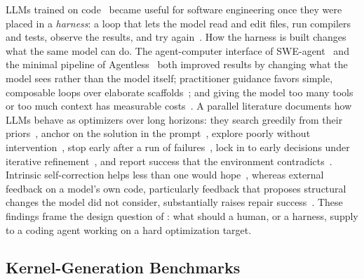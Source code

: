 LLMs trained on code~\cite{chen2021evaluating} became useful for software engineering once they were placed in a \emph{harness}: a loop that lets the model read and edit files, run compilers and tests, observe the results, and try again~\cite{yang2024sweagent,openhands,anthropic2025claudecode,codex}.
How the harness is built changes what the same model can do.
The agent-computer interface of SWE-agent~\cite{yang2024sweagent} and the minimal pipeline of Agentless~\cite{xia2024agentless} both improved results by changing what the model sees rather than the model itself; practitioner guidance favors simple, composable loops over elaborate scaffolds~\cite{anthropic2024effectiveagents}; and giving the model too many tools or too much context has measurable costs~\cite{langchain2025toolload,liu2024lost}.
A parallel literature documents how LLMs behave as optimizers over long horizons: they search greedily from their priors~\cite{redko2026priorknowledge}, anchor on the solution in the prompt~\cite{jones2022cognitivebiases}, explore poorly without intervention~\cite{krishnamurthy2024explore}, stop early after a run of failures~\cite{merouani2025compilot}, lock in to early decisions under iterative refinement~\cite{javaji2025turnwise}, and report success that the environment contradicts~\cite{advani2026falsesuccess}.
Intrinsic self-correction helps less than one would hope~\cite{huang2024cannotselfcorrect,sharma2024sycophancy}, whereas external feedback on a model's own code, particularly feedback that proposes structural changes the model did not consider, substantially raises repair success~\cite{olausson2024selfrepair,wang2024hypothesissearch}.
These findings frame the design question of : what should a human, or a harness, supply to a coding agent working on a hard optimization target.

\subsection{Kernel-Generation Benchmarks}
\label{background:subsec:kernel_benchmarks}

